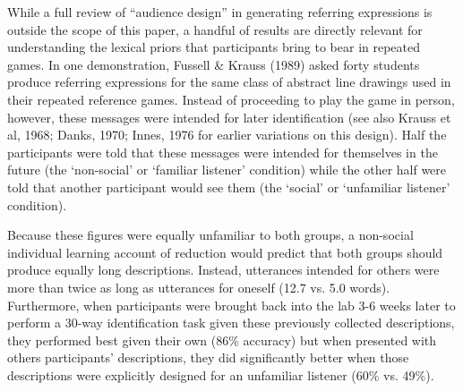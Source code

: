 \documentclass[11pt, floatsintext, man]{apa6}
\begin{document}
While a full review of ``audience design'' in generating referring expressions is outside the scope of this paper, a handful of results are directly relevant for understanding the lexical priors that participants bring to bear in repeated games. In one demonstration, Fussell \& Krauss (1989) asked forty students produce referring expressions for the same class of abstract line drawings used in their repeated reference games. Instead of proceeding to play the game in person, however, these messages were intended for later identification (see also Krauss et al, 1968; Danks, 1970; Innes, 1976 for earlier variations on this design). Half the participants were told that these messages were intended for themselves in the future (the `non-social' or `familiar listener' condition) while the other half were told that another participant would see them (the `social' or `unfamiliar listener' condition). 

Because these figures were equally unfamiliar to both groups, a non-social individual learning account of reduction would predict that both groups should produce equally long descriptions. Instead, utterances intended for others were more than twice as long as utterances for oneself (12.7 vs. 5.0 words). Furthermore, when participants were brought back into the lab 3-6 weeks later to perform a 30-way identification task given these previously collected descriptions, they performed best given their own (86\% accuracy) but when presented with others participants' descriptions, they did significantly better when those descriptions were explicitly designed for an unfamiliar listener (60\% vs. 49\%). 
\end{document}
